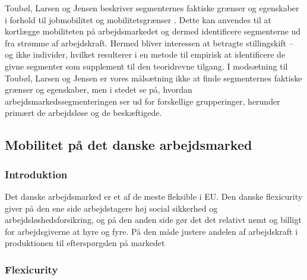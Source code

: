 Toubøl, Larsen og Jensen beskriver segmenternes faktiske grænser og egenskaber i forhold til jobmobilitet og mobilitetsgrænser \parencite[3]{Touboel2013}. Dette kan anvendes til at kortlægge mobiliteten på arbejdsmarkedet og dermed identificere segmenterne ud fra strømme af arbejdskraft. Hermed bliver interessen at betragte stillingskift – og ikke individer, hvilket resulterer i en metode til empirisk at identificere de givne segmenter som supplement til den teoridrevne tilgang. I modsætning til Toubøl, Larsen og Jensen er vores målsætning ikke at finde segmenternes faktiske grænser og egenskaber, men i stedet se på, hvordan arbejdsmarkedssegmenteringen ser ud for forskellige grupperinger, herunder primært de arbejdsløse og de beskæftigede.










\newpage \subsection{Mobilitet på det danske arbejdsmarked}


\subsubsection{Introduktion}

Det danske arbejdsmarked er et af de meste fleksible i EU. Den danske flexicurity giver på den ene side arbejdstagere høj social sikkerhed og arbejdsløshedsforsikring, og på den anden side gør det det relativt nemt og billigt for arbejdsgiverne at hyre og fyre. På den måde justere andelen af arbejdskraft i produktionen til efterspørgslen på markedet \textbf{ \parencite{Madsen2006} \parencite{Jensen2011}} %


\subsubsection{Flexicurity}

